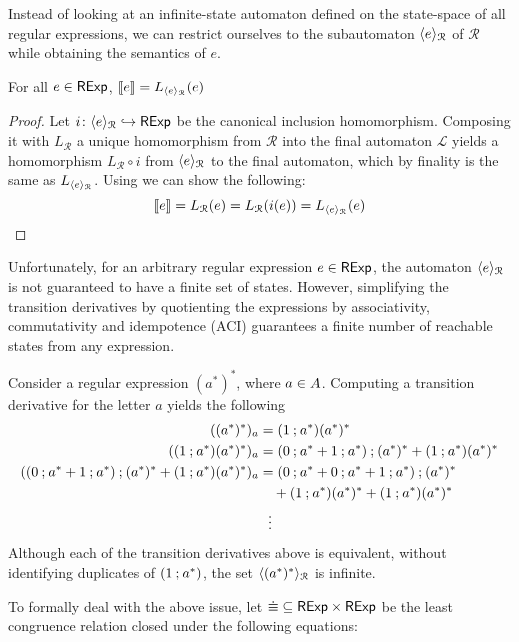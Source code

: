 Instead of looking at an infinite-state automaton defined on the state-space of all regular expressions, we can restrict ourselves to the subautomaton $\langle e \rangle_{\mathcal{R}}$ of $\mathcal{R}$ while obtaining the semantics of $e$.
\begin{lemma}\label{c2:lem:adequacy2}
    For all $e \in \mathsf{RExp}$, $\left\llbracket{e}\right\rrbracket = L_{\langle e \rangle_{\mathcal{R}}}(e)$
\end{lemma}
\begin{proof}
    Let $i \colon \langle e \rangle_{\mathcal{R}} \hookrightarrow \mathsf{RExp}$ be the canonical inclusion homomorphism. Composing it with $L_{\mathcal{R}}$ a unique homomorphism from $\mathcal{R}$ into the final automaton $\mathcal{L}$ yields a homomorphism $L_{\mathcal{R}} \circ i$ from $\langle e \rangle_{\mathcal{R}}$ to the final automaton, which by finality is the same as $L_{\langle e \rangle_{\mathcal{R}}}$. Using  we can show the following: 
    \[
        \left\llbracket{e}\right\rrbracket = L_{\mathcal{R}}(e)=  L_{\mathcal{R}}(i(e)) = L_{\langle e \rangle_{\mathcal{R}}}(e)\qedhere
    \]
\end{proof}
Unfortunately, for an arbitrary regular expression $e \in \mathsf{RExp}$, the automaton $\langle e \rangle_{\mathcal{R}}$ is not guaranteed to have a finite set of states. However, simplifying the transition derivatives by quotienting the expressions by associativity, commutativity and idempotence (ACI) guarantees a finite number of reachable states from any expression.
\begin{example}
	Consider a regular expression $(a^\ast)^\ast$, where $a \in {A}$. Computing a transition derivative for the letter $a$ yields the following
	\begin{align*}
		((a^\ast)^\ast)_a &= (1 \mathbin{;} a^\ast)(a^\ast)^\ast \\
		((1 \mathbin{;} a^\ast)(a^\ast)^\ast)_a &= (0\mathbin{;} a^\ast + 1\mathbin{;} a^\ast)\mathbin{;} (a^\ast)^\ast + (1 \mathbin{;} a^\ast)(a^\ast)^\ast \\
		((0\mathbin{;} a^\ast + 1\mathbin{;} a^\ast)\mathbin{;} (a^\ast)^\ast + (1 \mathbin{;} a^\ast)(a^\ast)^\ast)_a &= (0\mathbin{;} a^\ast + 0\mathbin{;} a^\ast + 1\mathbin{;} a^\ast)\mathbin{;} (a^\ast)^\ast\\ & \quad + (1 \mathbin{;} a^\ast)(a^\ast)^\ast + (1 \mathbin{;} a^\ast)(a^\ast)^\ast\\
		&~~\vdots
	\end{align*}
	Although each of the transition derivatives above is equivalent, without identifying duplicates of $ (1 \mathbin{;} a^\ast)$, the set $\langle (a^\ast)^\ast \rangle_{\mathcal{R}}$ is infinite.
\end{example}
To formally deal with the above issue, let ${{\mathrel{\dot\equiv}}} \subseteq {\mathsf{RExp}\times \mathsf{RExp}}$ be the least congruence relation closed under the following equations:
